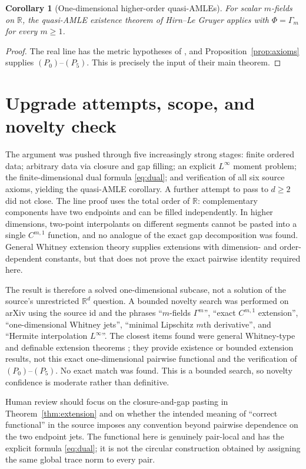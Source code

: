 \documentclass[11pt]{article}
\newtheorem{corollary}[theorem]{Corollary}
\newcommand{\R}{\mathbb R}
\begin{document}
\begin{corollary}[One-dimensional higher-order quasi-AMLEs]
For scalar $m$-fields on $\R$, the quasi-AMLE existence theorem of
Hirn--Le Gruyer applies with $\Phi=\Gamma_m$ for every $m\geq1$.
\end{corollary}

\begin{proof}
The real line has the metric hypotheses of \cite{HL}, and
Proposition~\ref{prop:axioms} supplies $(P_0)$--$(P_5)$.  This is precisely
the input of their main theorem.
\end{proof}

\section{Upgrade attempts, scope, and novelty check}

The argument was pushed through five increasingly strong stages: finite
ordered data; arbitrary data via closure and gap filling; an explicit
$L^\infty$ moment problem; the finite-dimensional dual formula
\eqref{eq:dual}; and verification of all six source axioms, yielding the
quasi-AMLE corollary.  A further attempt to pass to $d\geq2$ did not close.
The line proof uses the total order of $\R$: complementary components have
two endpoints and can be filled independently.  In higher dimensions,
two-point interpolants on different segments cannot be pasted into a
single $C^{m,1}$ function, and no analogue of the exact gap decomposition
was found.  General Whitney extension theory supplies extensions with
dimension- and order-dependent constants, but that does not prove the exact
pairwise identity required here.

The result is therefore a solved one-dimensional subcase, not a solution of
the source's unrestricted $\R^d$ question.  A bounded novelty search was
performed on arXiv using the source id and the phrases ``$m$-fields
$\Gamma^m$'', ``exact $C^{m,1}$ extension'', ``one-dimensional Whitney
jets'', ``minimal Lipschitz $m$th derivative'', and ``Hermite interpolation
$L^\infty$''.  The closest items found were general Whitney-type and
definable extension theorems \cite{S,PR}; they provide existence or bounded
extension results, not this exact one-dimensional pairwise functional and
the verification of $(P_0)$--$(P_5)$.  No exact match was found.  This is a
bounded search, so novelty confidence is moderate rather than definitive.

Human review should focus on the closure-and-gap pasting in
Theorem~\ref{thm:extension} and on whether the intended meaning of
``correct functional'' in the source imposes any convention beyond
pairwise dependence on the two endpoint jets.  The functional here is
genuinely pair-local and has the explicit formula \eqref{eq:dual}; it is not
the circular construction obtained by assigning the same global trace norm
to every pair.
\end{document}
